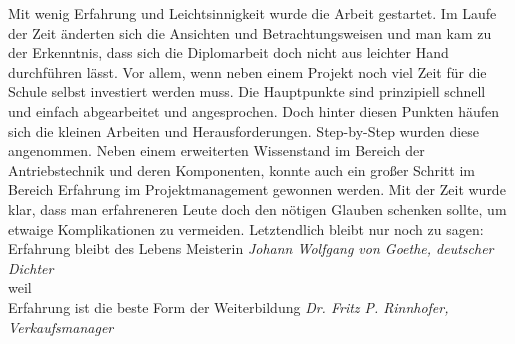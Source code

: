 Mit wenig Erfahrung und Leichtsinnigkeit wurde die Arbeit gestartet. Im Laufe der Zeit änderten sich die Ansichten und Betrachtungsweisen und man kam zu der Erkenntnis, dass sich die Diplomarbeit doch nicht aus leichter Hand durchführen lässt. Vor allem, wenn neben einem Projekt noch viel Zeit für die Schule selbst investiert werden muss. Die Hauptpunkte sind prinzipiell schnell und einfach abgearbeitet und angesprochen. Doch hinter diesen Punkten häufen sich die kleinen Arbeiten und Herausforderungen. Step-by-Step wurden diese angenommen. Neben einem erweiterten Wissenstand im Bereich der Antriebstechnik und deren Komponenten, konnte auch ein großer Schritt im Bereich Erfahrung im Projektmanagement gewonnen werden. Mit der Zeit wurde klar, dass man erfahreneren Leute doch den nötigen Glauben schenken sollte, um etwaige Komplikationen zu vermeiden. Letztendlich bleibt nur noch zu sagen: \\
Erfahrung bleibt des Lebens Meisterin \textit{Johann Wolfgang von Goethe, deutscher Dichter}  \\weil\\
Erfahrung ist die beste Form der Weiterbildung \textit{Dr. Fritz P. Rinnhofer, Verkaufsmanager}